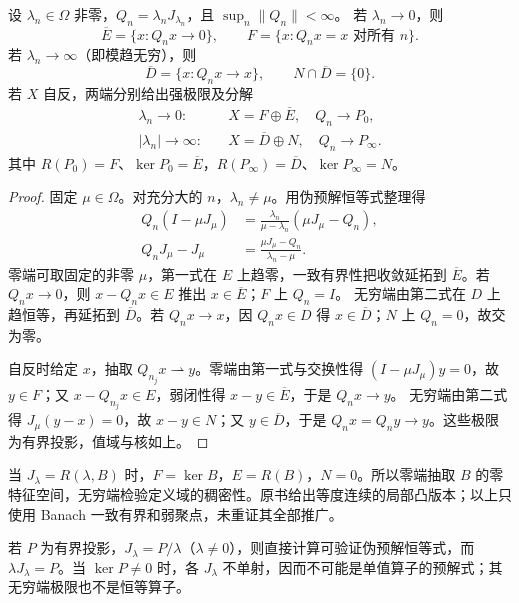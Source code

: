 \begin{theorem}[零端与无穷端的平均分解]\label{thm:y8-pseudo-ergodic}
设 $\lambda_n\in\Omega$ 非零，$Q_n=\lambda_nJ_{\lambda_n}$，且 $\sup_n\|Q_n\|<\infty$。
若 $\lambda_n\to0$，则
\[
 \overline E=\{x:Q_nx\to0\},\qquad
 F=\{x:Q_nx=x\text{ 对所有 }n\}.
\]
若 $\lambda_n\to\infty$（即模趋无穷），则
\[
 \overline D=\{x:Q_nx\to x\},\qquad N\cap\overline D=\{0\}.
\]
若 $X$ 自反，两端分别给出强极限及分解
\begin{align*}
 \lambda_n\to0:&\quad X=F\oplus\overline E,\quad Q_n\to P_0,\\
 |\lambda_n|\to\infty:&\quad X=\overline D\oplus N,\quad Q_n\to P_\infty.
\end{align*}
其中 $R(P_0)=F$、$\ker P_0=\overline E$，$R(P_\infty)=\overline D$、$\ker P_\infty=N$。
\end{theorem}
\begin{proof}
固定 $\mu\in\Omega$。对充分大的 $n$，$\lambda_n\ne\mu$。用伪预解恒等式整理得
\begin{align}
 Q_n(I-\mu J_\mu)&=\frac{\lambda_n}{\mu-\lambda_n}(\mu J_\mu-Q_n),\label{eq:y8-pseudo-zero}\\
 Q_nJ_\mu-J_\mu&=\frac{\mu J_\mu-Q_n}{\lambda_n-\mu}.\label{eq:y8-pseudo-infinity}
\end{align}
零端可取固定的非零 $\mu$，第一式在 $E$ 上趋零，一致有界性把收敛延拓到 $\overline E$。若 $Q_nx\to0$，则 $x-Q_nx\in E$ 推出 $x\in\overline E$；$F$ 上 $Q_n=I$。
无穷端由第二式在 $D$ 上趋恒等，再延拓到 $\overline D$。若 $Q_nx\to x$，因 $Q_nx\in D$ 得 $x\in\overline D$；$N$ 上 $Q_n=0$，故交为零。

自反时给定 $x$，抽取 $Q_{n_j}x\rightharpoonup y$。零端由第一式与交换性得 $(I-\mu J_\mu)y=0$，故 $y\in F$；又 $x-Q_{n_j}x\in E$，弱闭性得 $x-y\in\overline E$，于是 $Q_nx\to y$。
无穷端由第二式得 $J_\mu(y-x)=0$，故 $x-y\in N$；又 $y\in\overline D$，于是 $Q_nx=Q_ny\to y$。这些极限为有界投影，值域与核如上。
\end{proof}

当 $J_\lambda=R(\lambda,B)$ 时，$F=\ker B$，$E=R(B)$，$N=0$。所以零端抽取 $B$ 的零特征空间，无穷端检验定义域的稠密性。原书给出等度连续的局部凸版本；以上只使用 Banach 一致有界和弱聚点，未重证其全部推广。

\begin{example}[不是单值算子预解式的伪预解式]
若 $P$ 为有界投影，$J_\lambda=P/\lambda$（$\lambda\ne0$），则直接计算可验证伪预解恒等式，而 $\lambda J_\lambda=P$。当 $\ker P\ne0$ 时，各 $J_\lambda$ 不单射，因而不可能是单值算子的预解式；其无穷端极限也不是恒等算子。
\end{example}

